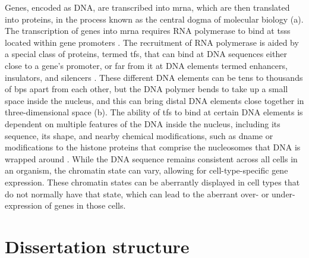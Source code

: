 Genes, encoded as DNA, are transcribed into \gls{mrna}, which are then translated into proteins, in the process known as the central dogma of molecular biology \cite{albertsMolecularBiologyCell2015} (a).
The transcription of genes into \gls{mrna} requires RNA polymerase to bind at \glspl{tss} located within gene promoters \cite{goodrichUnexpectedRolesCore2010}.
The recruitment of RNA polymerase is aided by a special class of proteins, termed \glspl{tf}, that can bind at DNA sequences either close to a gene's promoter, or far from it at DNA elements termed enhancers, insulators, and silencers \cite{schoenfelderLongrangeEnhancerPromoter2019,spitzTranscriptionFactorsEnhancer2012,ongEnhancerFunctionNew2011,anderssonDeterminantsEnhancerPromoter2020,gasznerInsulatorsExploitingTranscriptional2006,oudelaarRelationshipGenomeStructure2020}.
These different DNA elements can be tens to thousands of \glspl{bp} apart from each other, but the DNA polymer bends to take up a small space inside the nucleus, and this can bring distal DNA elements close together in three-dimensional space \cite{finnMolecularBasisBiological2019,zhouChartingHistoneModifications2011} (b).
The ability of \glspl{tf} to bind at certain DNA elements is dependent on multiple features of the DNA inside the nucleus, including its sequence, its shape, and nearby chemical modifications, such as \gls{dname} or modifications to the histone proteins that comprise the nucleosomes that DNA is wrapped around \cite{zhuTranscriptionFactorsReaders2016,fureyChIPSeqNew2012,carterEpigeneticBasisCellular2021}.
While the DNA sequence remains consistent across all cells in an organism, the chromatin state can vary, allowing for cell-type-specific gene expression.
These chromatin states can be aberrantly displayed in cell types that do not normally have that state, which can lead to the aberrant over- or under-expression of genes in those cells.



\subsection{}

\section{Dissertation structure}

